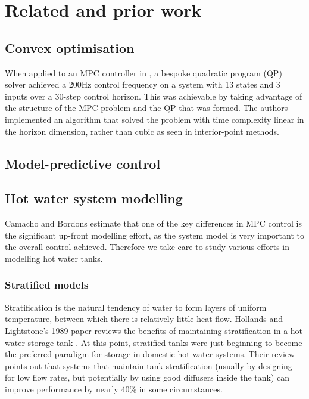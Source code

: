 \chapter{Related and prior work}

\section{Convex optimisation}


When applied to an MPC controller in \cite{Wang10}, a bespoke quadratic program (QP) solver achieved a 200Hz control frequency on a system with 13 states and 3 inputs over a 30-step control horizon.
This was achievable by taking advantage of the structure of the MPC problem and the QP that was formed.
The authors implemented an algorithm that solved the problem with time complexity linear in the horizon dimension, rather than cubic as seen in interior-point methods.

\section{Model-predictive control}


\section{Hot water system modelling}

Camacho and Bordons estimate that one of the key differences in MPC control is the significant up-front modelling effort, as the system model is very important to the overall control achieved.
Therefore we take care to study various efforts in modelling hot water tanks.

\subsection{Stratified models}

Stratification is the natural tendency of water to form layers of uniform temperature, between which there is relatively little heat flow.
Hollands and Lightstone's 1989 paper reviews the benefits of maintaining stratification in a hot water storage tank \cite{Hollands89}.
At this point, stratified tanks were just beginning to become the preferred paradigm for storage in domestic hot water systems.
Their review points out that systems that maintain tank stratification (usually by designing for low flow rates, but potentially by using good diffusers inside the tank) can improve performance by nearly 40\% in some circumstances.

